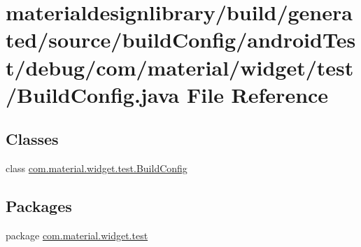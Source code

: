\hypertarget{materialdesignlibrary_2build_2generated_2source_2build_config_2android_test_2debug_2com_2materiafc4032b8525be165ba7097b857b172de}{}\section{materialdesignlibrary/build/generated/source/build\+Config/android\+Test/debug/com/material/widget/test/\+Build\+Config.java File Reference}
\label{materialdesignlibrary_2build_2generated_2source_2build_config_2android_test_2debug_2com_2materiafc4032b8525be165ba7097b857b172de}
\subsection*{Classes}
\begin{DoxyCompactItemize}
\item 
class \hyperlink{classcom_1_1material_1_1widget_1_1test_1_1_build_config}{com.\+material.\+widget.\+test.\+Build\+Config}
\end{DoxyCompactItemize}
\subsection*{Packages}
\begin{DoxyCompactItemize}
\item 
package \hyperlink{namespacecom_1_1material_1_1widget_1_1test}{com.\+material.\+widget.\+test}
\end{DoxyCompactItemize}
